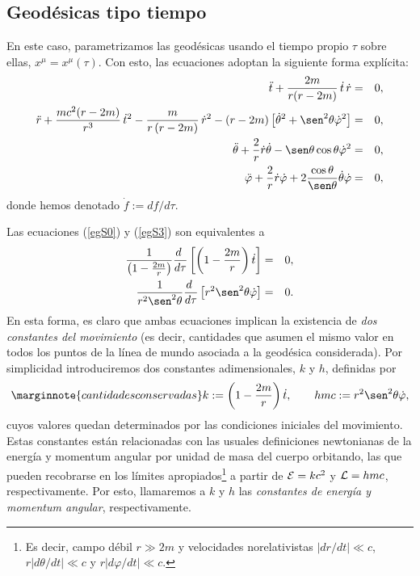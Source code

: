 \subsection{Geodésicas tipo tiempo}
En este caso, parametrizamos las geodésicas usando el tiempo propio $\tau$ sobre ellas, $x^\mu=x^\mu(\tau)$. Con esto, las ecuaciones adoptan la siguiente forma explícita:
\begin{eqnarray}
\ddot{t}+\frac{2m}{r(r-2m) }\,\dot{t}\,\dot{r}&=&0, \label{egS0}\\
\ddot{r}+\frac{mc^2(r-2m)}{r^3}\,\dot{t}^2-\frac{m}{r\left(
r-2m\right) }\,\dot{r}^2-(r-2m) \left[ \dot{\theta}^2+\sen
^2\theta \dot{\varphi}^2\right] &=&0, \label{egS1}\\
\ddot{\theta}+\frac{2}{r}\dot{r}\dot{\theta}-\sen \theta \cos \theta
\dot{\varphi}^2 &=&0, \label{egS2}\\
\ddot{\varphi}+\frac2{r}\dot{r}\dot{\varphi}+2\frac{\cos\theta}{\sen\theta}
\dot{\theta}\dot{\varphi}&=&0,\label{egS3}
\end{eqnarray}%
donde hemos denotado $\dot{f}:={df}/{d\tau}$.

Las ecuaciones (\ref{egS0}) y (\ref{egS3}) son equivalentes a
\begin{eqnarray}
\frac{1}{\left(1-\frac{2m}{r}\right)} \frac{d\ }{d\tau}\left[\left(1-\frac{2m}{r}\right)\dot{t}\right]&=&0,\\
\frac{1}{r^2\sen^2\theta} \frac{d\ }{d\tau}\left[r^2\sen^2\theta\dot{\varphi}\right]&=&0.
\end{eqnarray}
En esta forma, es claro que ambas ecuaciones implican la existencia de \textit{dos constantes del movimiento} (es decir, cantidades que asumen el mismo valor en todos los puntos de la línea de mundo asociada a la geodésica considerada). Por simplicidad introduciremos dos constantes adimensionales, $k$ y $h$, definidas por
\begin{equation}\marginnote{cantidades conservadas}
 k:=\left(1-\frac{2m}{r}\right)\dot{t}, \qquad hmc:=r^2\sen^2\theta\dot{\varphi},
\label{kh}
\end{equation}
cuyos valores quedan determinados por las condiciones iniciales del movimiento.
Estas constantes están relacionadas con las usuales definiciones newtonianas de la energía y momentum angular por unidad de masa del cuerpo orbitando, las que pueden recobrarse en los límites apropiados\footnote{Es decir, campo débil $r\gg 2m$ y velocidades norelativistas $|dr/dt|\ll c$, $r|d\theta/dt|\ll c$ y $r|d\varphi/dt|\ll c$.} a partir de ${\cal E}=kc^2$ y ${\cal L}=hmc$, respectivamente. Por esto, llamaremos a $k$ y $h$ las \textit{constantes de energía y momentum angular}, respectivamente.

